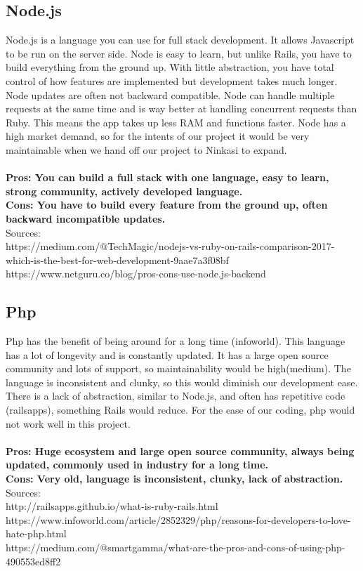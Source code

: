 \documentclass[draftclsnofoot,onecolumn,letterpaper,10pt,compsoc]{IEEEtran}
\begin{document}
	\subsection{Node.js}
			Node.js is a language you can use for full stack development.
			It allows Javascript to be run on the server side.
			Node is easy to learn, but unlike Rails, you have to build everything from the ground up.
			With little abstraction, you have total control of how features are implemented but development takes much longer.
			Node updates are often not backward compatible.
			Node can handle multiple requests at the same time and is way better at handling concurrent requests than Ruby.
			This means the app takes up less RAM and functions faster.
			Node has a high market demand, so for the intents of our project it would be very maintainable when we hand off our project to Ninkasi to expand.
			\\ \\
			\textbf{Pros: You can build a full stack with one language, easy to learn, strong community, actively developed language.}
			\\
			\textbf{Cons: You have to build every feature from the ground up, often backward incompatible updates.}
			\\
			Sources: \\
			https://medium.com/@TechMagic/nodejs-vs-ruby-on-rails-comparison-2017-which-is-the-best-for-web-development-9aae7a3f08bf \\
			https://www.netguru.co/blog/pros-cons-use-node.js-backend \\

	\subsection{Php}
		Php has the benefit of being around for a long time (infoworld).
		This language has a lot of longevity and is constantly updated. It has a large open source community and lots of support, so maintainability would be high(medium).
		The language is inconsistent and clunky, so this would diminish our development ease.
		There is a lack of abstraction, similar to Node.js, and often has repetitive code (railsapps), something Rails would reduce.
		For the ease of our coding, php would not work well in this project.
		\\ \\
		\textbf{Pros: Huge ecosystem and large open source community, always being updated, commonly used in industry for a long time.}
		\\
		\textbf{Cons: Very old, language is inconsistent, clunky, lack of abstraction.}
		\\
		Sources: \\
		http://railsapps.github.io/what-is-ruby-rails.html \\
		https://www.infoworld.com/article/2852329/php/reasons-for-developers-to-love-hate-php.html \\
		https://medium.com/@smartgamma/what-are-the-pros-and-cons-of-using-php-490553ed8ff2 \\

%
\end{document}
